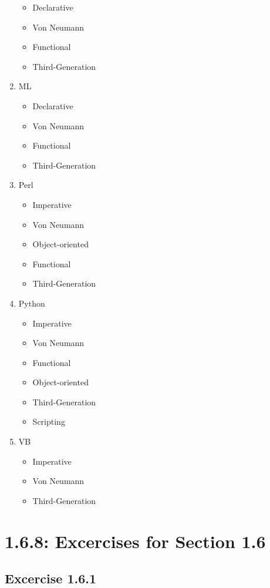 \documentclass{article}
\begin{document}
\begin{enumerate}
\begin{itemize}
        \item Declarative
        \item Von Neumann
        \item Functional 
        \item Third-Generation
    \end{itemize}
    \item ML
    \begin{itemize}
        \item Declarative
        \item Von Neumann
        \item Functional 
        \item Third-Generation
    \end{itemize}
    \item Perl
    \begin{itemize}
        \item Imperative
        \item Von Neumann
        \item Object-oriented
        \item Functional 
        \item Third-Generation
    \end{itemize}
    \item Python
    \begin{itemize}
        \item Imperative
        \item Von Neumann
        \item Functional
        \item Object-oriented  
        \item Third-Generation
        \item Scripting
    \end{itemize}
    \item VB
    \begin{itemize}
        \item Imperative
        \item Von Neumann 
        \item Third-Generation
    \end{itemize}
\end{enumerate}
\section*{1.6.8: Excercises for Section 1.6}

\subsection*{Excercise 1.6.1}
\end{document}
